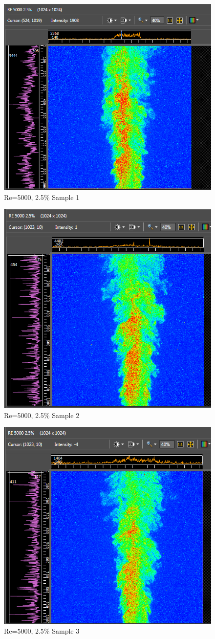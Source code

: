 \documentclass[preview,12pt]{article}
\begin{document}
\begin{figure}[h]
    \centering
    \includegraphics[width=0.55\linewidth]{RE-5000-25-1st.PNG}
    \caption{{\footnotesize Re=5000, 2.5\% Sample 1}}
\end{figure}
\begin{figure}[h]
    \centering
    \includegraphics[width=0.55\linewidth]{RE-5000-25-2nd.PNG}
    \caption{{\footnotesize Re=5000, 2.5\% Sample 2}}
\end{figure}
\begin{figure}[h]
    \centering
    \includegraphics[width=0.55\linewidth]{RE-5000-25-3rd.PNG}
    \caption{{\footnotesize Re=5000, 2.5\% Sample 3}}
\end{figure}
\end{document}
